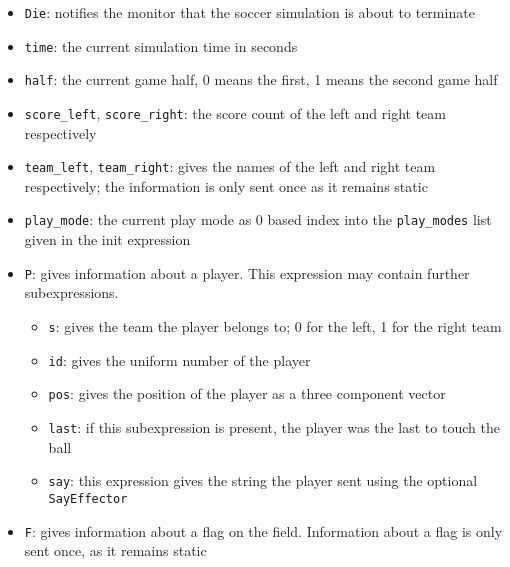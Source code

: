 \begin{itemize}
  
\item \texttt{Die}: notifies the monitor that the soccer simulation is about to
  terminate
  
\item \texttt{time}: the current simulation time in seconds
  
\item \texttt{half}: the current game half, 0 means the first, 1 means the
  second game half
  
\item \texttt{score\_left}, \texttt{score\_right}: the score count of
  the left and right team respectively
  
\item \texttt{team\_left}, \texttt{team\_right}: gives the names of the
  left and right team respectively; the information is only sent once
  as it remains static
  
\item \texttt{play\_mode}: the current play mode as 0 based index into
  the \texttt{play\_modes} list given in the init expression
  
\item \texttt{P}: gives information about a player. This expression
  may contain further subexpressions.  

  \begin{itemize}
  \item \texttt{s}: gives the team the player belongs to; 0 for the
    left, 1 for the right team
    
  \item \texttt{id}: gives the uniform number of the player
    
  \item \texttt{pos}: gives the position of the player as a three
    component vector
    
  \item \texttt{last}: if this subexpression is present, the player
    was the last to touch the ball 
    
  \item \texttt{say}: this expression gives the string the player sent
    using the optional \texttt{SayEffector}

  \end{itemize}
  
\item \texttt{F}: gives information about a flag on the field.
  Information about a flag is only sent once, as it remains static 


\end{itemize}
